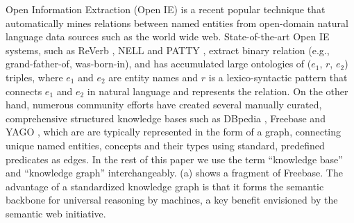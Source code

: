 
Open Information Extraction (Open IE) is a recent popular technique
that automatically mines relations between named entities 
from open-domain natural language
data sources such as the world wide web. 
State-of-the-art Open IE systems, such as ReVerb \cite{fader2011identifying},
NELL \cite{carlson2010toward} and PATTY \cite{nakashole2012patty}, extract binary 
relation (e.g., grand-father-of, was-born-in), and has accumulated large 
ontologies of ($e_1$, $r$, $e_2$) triples, where $e_1$ and $e_2$ are
entity names and $r$ is a lexico-syntactic pattern that connects 
$e_1$ and $e_2$ in natural language and represents the relation. 
On the other hand, numerous community efforts have
created several manually curated, comprehensive structured knowledge bases
such as DBpedia \cite{auer2007dbpedia}, Freebase \cite{bollacker2008freebase} and YAGO \cite{suchanek2007yago}, which are
are typically represented in the form of a graph, 
connecting unique named entities, concepts and their types 
using standard, predefined predicates as edges.
In the rest of this paper we use the term ``knowledge base'' and 
``knowledge graph'' interchangeably. 
(a)  shows a fragment of Freebase.
The advantage of a standardized knowledge graph is that it forms the 
semantic backbone for universal reasoning by machines, 
a key benefit envisioned by the semantic web initiative. 

